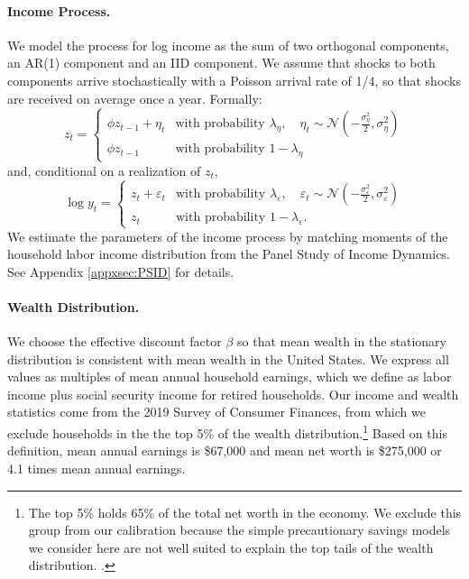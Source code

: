 
\paragraph{Income Process.}
We model the process for log income as the sum of two orthogonal components, an AR(1) component and an IID component. We assume that shocks to both components arrive stochastically with a Poisson arrival rate of 1/4, so that shocks are received  on average once a year. Formally: 
\begin{equation}
	z_{t}=\left\{ 
	\begin{array}{ll}
	\phi z_{t-1}+\eta _{t} & \text{with probability }\lambda _{\eta },\quad  \eta _{t}\sim \mathcal{N}\left(-\frac{\sigma^2_{\eta
	}}{2},\sigma^2_{\eta }\right) \label{eq:income_process_discrete} \\ 
	\phi z_{t-1} & \text{with probability }1-\lambda _{\eta }%
	\end{array}
	\right. 
\end{equation}
	and, conditional on a realization of $z_{t},$ 
\begin{equation*}
	\log y_{t}=\left\{ 
	\begin{array}{ll}
	z_{t}+\varepsilon _{t} & \text{with probability }\lambda _{\varepsilon },\quad  \varepsilon _{t} \sim \mathcal{N}\left( -\frac{\sigma^2_{\varepsilon
	}}{2},\sigma^2_{\varepsilon
	}\right)  \\ 
	z_{t} & \text{with probability }1-\lambda _{\varepsilon }.%
	\end{array}%
	\right. 
\end{equation*}
We estimate the parameters of the income process by matching moments of the household labor income distribution from the Panel Study of Income Dynamics. See Appendix \ref{appxsec:PSID} for details.

\paragraph{Wealth Distribution.}
We choose the effective discount factor $\beta$ so that mean wealth in the stationary distribution is consistent with mean wealth in the United States. We express all values as multiples of mean annual household earnings, which we define as labor income plus social security income for retired households. Our income and wealth statistics come from the 2019 Survey of Consumer Finances, from which we exclude households in the the top 5\% of the wealth distribution.\footnote{The top 5\% holds 65\% of the total net worth in the economy. We exclude this group from our calibration because the simple precautionary savings models we consider here are not well suited to explain the top tails of the wealth distribution. \citep{benhabib2018skewed,de2017saving}. } Based on this definition, mean annual earnings is \$67,000 and mean net worth is \$275,000 or 4.1 times mean annual earnings.

